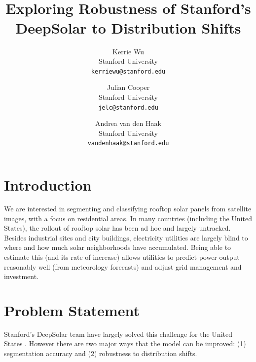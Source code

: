 \documentclass[10pt,twocolumn,letterpaper]{article}
\begin{document}
\title{\\Exploring Robustness of Stanford's DeepSolar to Distribution Shifts}


\author{Kerrie Wu \\
  Stanford University \\
  {\tt\small kerriewu@stanford.edu} \\
   \and
    Julian Cooper \\
  Stanford University \\
  \tt\small {jelc@stanford.edu} \\
   \and
   Andrea van den Haak \\
  Stanford University \\
  \tt\small {vandenhaak@stanford.edu} \\
}
\maketitle


\section{Introduction}
\label{sec:intro}

We are interested in segmenting and classifying rooftop solar panels from satellite images, with a focus on residential areas. In many countries (including the United States), the rollout of rooftop solar has been ad hoc and largely untracked. Besides industrial sites and city buildings, electricity utilities are largely blind to where and how much solar neighborhoods have accumulated. Being able to estimate this (and its rate of increase) allows utilities to predict power output reasonably well (from meteorology forecasts) and adjust grid management and investment. \cite{Kasmi2023}

\section{Problem Statement}
Stanford's DeepSolar team have largely solved this challenge for the United States \cite{DeepSolar1} \cite{DeepSolar2}. However there are two major ways that the model can be improved: (1) segmentation accuracy and (2) robustness to distribution shifts.
\end{document}
